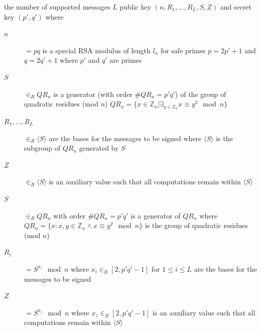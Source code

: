 the number of supported messages $L$
public key $(n, R_1, \dots, R_L, S, Z)$
and secret key $(p', q')$ where
\begin{description}
  \item[$n$] $= pq$ is a special RSA modulus of length $l_n$ for safe primes
    $p = 2p' + 1$ and $q = 2q' + 1$ where $p'$ and $q'$ are primes
  \item[$S$] $\in_R QR_n$ is a generator (with order $\#QR_n = p'q'$) of the
    group of quadratic residues (mod $n$)
    $QR_n = \{x \in \mathbb{Z}_n | \exists_{y \in \mathbb{Z}_n} x \equiv y^2 \mod n \}$
  \item[$R_1, \dots, R_L$] $\in_R \langle S \rangle$ are the bases for the
    messages to be signed where $\langle S \rangle$ is the subgroup of $QR_n$
    generated by $S$
  \item[$Z$] $\in_R \langle S \rangle$ is an auxiliary value such that all
    computations remain within $\langle S \rangle$
  \item[$S$] $\in_R QR_n$ with order $\#QR_n = p'q'$ is a generator of $QR_n$
    where $QR_n = \{ x : x,y \in \mathbb{Z}_n \land x \equiv y^2 \mod n \}$ is
    the group of quadratic residues (mod $n$)
  \item[$R_i$] $= S^{x_i} \mod n$ where $x_i \in_R [2, p'q' - 1]$ for
    $1 \leq i \leq L$ are the bases for the messages to be signed
  \item[$Z$] $= S^{x_z} \mod n$ where $x_z \in_R [2, p'q' - 1]$ is an auxiliary
    value such that all computations remain within $\langle S \rangle$
\end{description}

